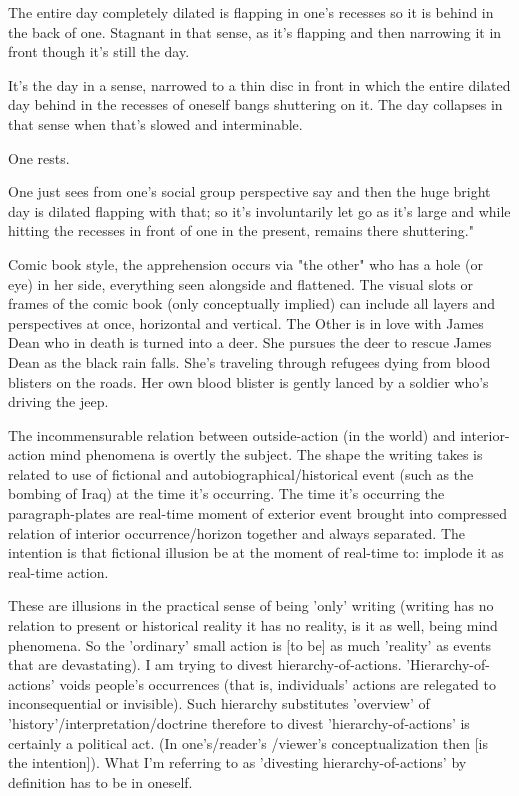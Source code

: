 The entire day completely dilated is flapping in one's recesses so it is
behind in the back of one. Stagnant in that sense, as it's flapping and
then narrowing it in front though it's still the day.

It's the day in a sense, narrowed to a thin disc in front in which the
entire dilated day behind in the recesses of oneself bangs shuttering on
it. The day collapses in that sense when that's slowed and interminable.

One rests.

One just sees from one's social group perspective say and then the huge
bright day is dilated flapping with that; so it's involuntarily let go
as it's large and while hitting the recesses in front of one in the
present, remains there shuttering."

Comic book style, the apprehension occurs via "the other" who has a hole
(or eye) in her side, everything seen alongside and flattened. The
visual slots or frames of the comic book (only conceptually implied) can
include all layers and perspectives at once, horizontal and vertical.
The Other is in love with James Dean who in death is turned into a deer.
She pursues the deer to rescue James Dean as the black rain falls. She's
traveling through refugees dying from blood blisters on the roads. Her
own blood blister is gently lanced by a soldier who's driving the jeep.

The incommensurable relation between outside-action (in the world) and
interior-action mind phenomena is overtly the subject. The shape the
writing takes is related to use of fictional and
autobiographical/historical event (such as the bombing of Iraq) at the
time it's occurring. The time it's occurring the paragraph-plates are
real-time moment of exterior event brought into compressed relation of
interior occurrence/horizon together and always separated. The intention
is that fictional illusion be at the moment of real-time to: implode it
as real-time action.

These are illusions in the practical sense of being 'only' writing
(writing has no relation to present or historical reality it has no
reality, is it as well, being mind phenomena. So the 'ordinary' small
action is {[}to be{]} as much 'reality' as events that are devastating).
I am trying to divest hierarchy-of-actions. 'Hierarchy-of-actions' voids
people's occurrences (that is, individuals' actions are relegated to
inconsequential or invisible). Such hierarchy substitutes 'overview' of
'history'/interpretation/doctrine therefore to divest
'hierarchy-of-actions' is certainly a political act. (In one's/reader's
/viewer's conceptualization then {[}is the intention{]}). What I'm
referring to as 'divesting hierarchy-of-actions' by definition has to be
in oneself.

